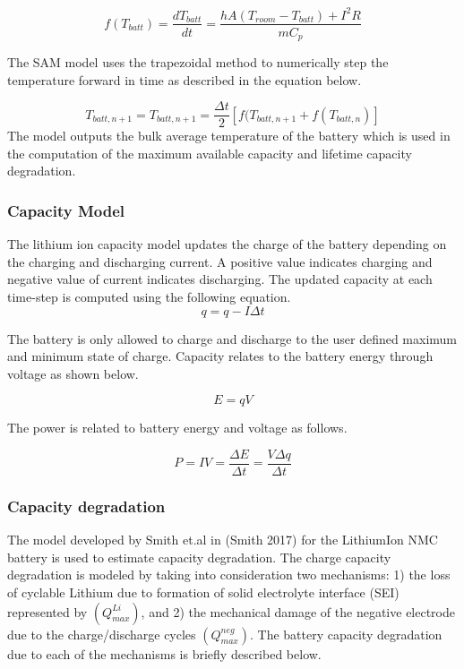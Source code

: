 \begin{equation}
f(T_{batt}) = \frac{dT_{batt}}{dt}= \frac{hA(T_{room} - T_{batt}) + I^2R}{mC_p}
\label{Equation: battery_temp_nmc}
\end{equation}

The SAM model uses the trapezoidal method to numerically step the temperature forward in time as described in the equation below. 

\begin{equation}
T_{batt,n+1} = T_{batt,n+1} = \frac{\Delta t}{2}\left[f(T_{batt,n+1} + f(T_{batt,n})\right] 
\label{Equation: batt_temp_trapezoidal}
\end{equation}
The model outputs the bulk average temperature of the battery which is used in the computation of the maximum available capacity and lifetime capacity degradation. 

\subsubsection{Capacity Model}
The lithium ion capacity model updates the charge of the battery depending on the charging and discharging current. A positive value indicates charging and negative value of current indicates discharging. The updated capacity at each time-step is computed using the following equation. 
\begin{equation}
q = q - I\Delta t
\label{Equation: capacity_update_nmc}
\end{equation}

The battery is only allowed to charge and discharge to the user defined maximum and minimum state of charge. Capacity relates to the battery energy through voltage as shown below. 

\begin{equation}
E = qV
\label{Equation: energy_nmc}
\end{equation}

The power is related to battery energy and voltage as follows. 

\begin{equation}
P = IV = \frac{\Delta E}{\Delta t} = \frac{V \Delta q}{\Delta t}
\label{Equation: power_nmc}
\end{equation}

\subsubsection{Capacity degradation}
The  model  developed by Smith et.al in (Smith 2017) for the LithiumIon NMC battery is used to estimate capacity degradation. 
The charge capacity degradation is modeled by taking into consideration two mechanisms: 1) the loss of cyclable Lithium due to formation of solid electrolyte interface (SEI) represented by $(Q_{max}^{Li})$, and 2) the mechanical damage of the negative electrode due to the charge/discharge cycles $(Q_{max}^{neg})$. The battery capacity degradation due to each of the mechanisms is briefly described below.

